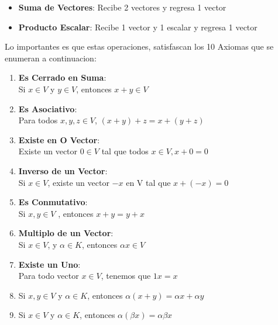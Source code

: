 \documentclass[12pt]{report}							    %
\begin{document}
        \begin{itemize}
            \item \textbf{Suma de Vectores}: Recibe 2 vectores y regresa 1 vector
            \item \textbf{Producto Escalar}: Recibe 1 vector y 1 escalar y regresa 1 vector
        \end{itemize}

        Lo importantes es que estas operaciones, satisfascan los 10 Axiomas
        que se enumeran a continuacion:

        \begin{enumerate}
            \item \textbf{Es Cerrado en Suma}:\\
            Si $x \in V$ y $y \in V$, entonces $x+y \in V$

            \item \textbf{Es Asociativo}:\\
            Para todos $x,y,z \in V$, $(x+y) + z = x + (y+z)$

            \item \textbf{Existe en O Vector}:\\
            Existe un vector $0 \in V$ tal que todos $x \in V, x + 0 = 0 $

            \item \textbf{Inverso de un Vector}:\\
            Si $x \in V$, existe un vector $-x$ en V tal que $x+(-x) = 0$

            \item \textbf{Es Conmutativo}:\\
            Si $x,y \in V$ , entonces $x + y = y + x$

            \item \textbf{Multiplo de un Vector}:\\
            Si $x \in V$, y $\alpha \in K$, entonces $\alpha x \in V$

            \item \textbf{Existe un Uno}:\\
            Para todo vector $x \in V$, tenemos que $1x = x$  

            \item Si $x,y \in V$ y $\alpha \in K$, entonces $\alpha(x+y) = \alpha x + \alpha y$

            \item Si $x \in V$ y $\alpha \in K$, entonces $\alpha(\beta x) = \alpha \beta x$          

        \end{enumerate}
\end{document}
